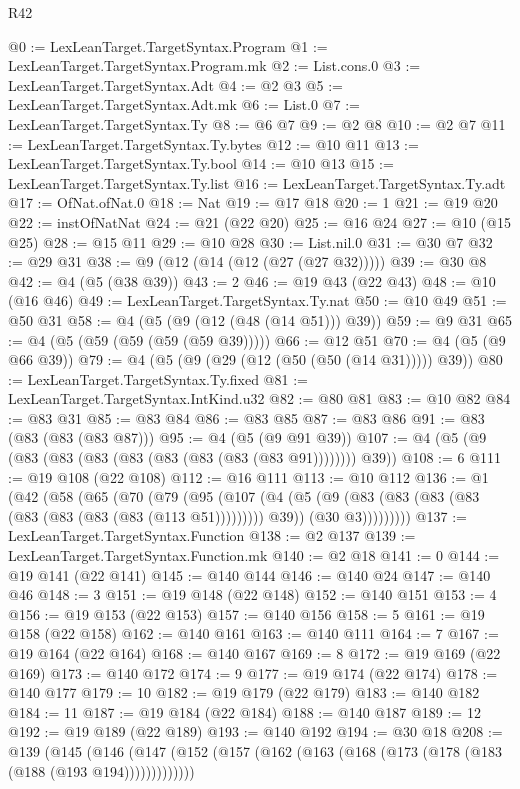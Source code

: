 \begin{lexlean}{R42}
\begin{coremodule}
@0 := LexLeanTarget.TargetSyntax.Program
@1 := LexLeanTarget.TargetSyntax.Program.mk
@2 := List.cons.{0}
@3 := LexLeanTarget.TargetSyntax.Adt
@4 := @2 @3
@5 := LexLeanTarget.TargetSyntax.Adt.mk
@6 := List.{0}
@7 := LexLeanTarget.TargetSyntax.Ty
@8 := @6 @7
@9 := @2 @8
@10 := @2 @7
@11 := LexLeanTarget.TargetSyntax.Ty.bytes
@12 := @10 @11
@13 := LexLeanTarget.TargetSyntax.Ty.bool
@14 := @10 @13
@15 := LexLeanTarget.TargetSyntax.Ty.list
@16 := LexLeanTarget.TargetSyntax.Ty.adt
@17 := OfNat.ofNat.{0}
@18 := Nat
@19 := @17 @18
@20 := 1
@21 := @19 @20
@22 := instOfNatNat
@24 := @21 (@22 @20)
@25 := @16 @24
@27 := @10 (@15 @25)
@28 := @15 @11
@29 := @10 @28
@30 := List.nil.{0}
@31 := @30 @7
@32 := @29 @31
@38 := @9 (@12 (@14 (@12 (@27 (@27 @32)))))
@39 := @30 @8
@42 := @4 (@5 (@38 @39))
@43 := 2
@46 := @19 @43 (@22 @43)
@48 := @10 (@16 @46)
@49 := LexLeanTarget.TargetSyntax.Ty.nat
@50 := @10 @49
@51 := @50 @31
@58 := @4 (@5 (@9 (@12 (@48 (@14 @51))) @39))
@59 := @9 @31
@65 := @4 (@5 (@59 (@59 (@59 (@59 @39)))))
@66 := @12 @51
@70 := @4 (@5 (@9 @66 @39))
@79 := @4 (@5 (@9 (@29 (@12 (@50 (@50 (@14 @31))))) @39))
@80 := LexLeanTarget.TargetSyntax.Ty.fixed
@81 := LexLeanTarget.TargetSyntax.IntKind.u32
@82 := @80 @81
@83 := @10 @82
@84 := @83 @31
@85 := @83 @84
@86 := @83 @85
@87 := @83 @86
@91 := @83 (@83 (@83 (@83 @87)))
@95 := @4 (@5 (@9 @91 @39))
@107 := @4 (@5 (@9 (@83 (@83 (@83 (@83 (@83 (@83 (@83 (@83 @91)))))))) @39))
@108 := 6
@111 := @19 @108 (@22 @108)
@112 := @16 @111
@113 := @10 @112
@136 := @1
    (@42
      (@58
        (@65
          (@70
            (@79
              (@95
                (@107
                  (@4
                    (@5 (@9 (@83 (@83 (@83 (@83 (@83 (@83 (@83 (@83 (@113 @51))))))))) @39))
                    (@30 @3)))))))))
@137 := LexLeanTarget.TargetSyntax.Function
@138 := @2 @137
@139 := LexLeanTarget.TargetSyntax.Function.mk
@140 := @2 @18
@141 := 0
@144 := @19 @141 (@22 @141)
@145 := @140 @144
@146 := @140 @24
@147 := @140 @46
@148 := 3
@151 := @19 @148 (@22 @148)
@152 := @140 @151
@153 := 4
@156 := @19 @153 (@22 @153)
@157 := @140 @156
@158 := 5
@161 := @19 @158 (@22 @158)
@162 := @140 @161
@163 := @140 @111
@164 := 7
@167 := @19 @164 (@22 @164)
@168 := @140 @167
@169 := 8
@172 := @19 @169 (@22 @169)
@173 := @140 @172
@174 := 9
@177 := @19 @174 (@22 @174)
@178 := @140 @177
@179 := 10
@182 := @19 @179 (@22 @179)
@183 := @140 @182
@184 := 11
@187 := @19 @184 (@22 @184)
@188 := @140 @187
@189 := 12
@192 := @19 @189 (@22 @189)
@193 := @140 @192
@194 := @30 @18
@208 := @139
    (@145 (@146 (@147 (@152 (@157 (@162 (@163 (@168 (@173 (@178 (@183 (@188 (@193 @194)))))))))))))

\end{coremodule}
\end{lexlean}
